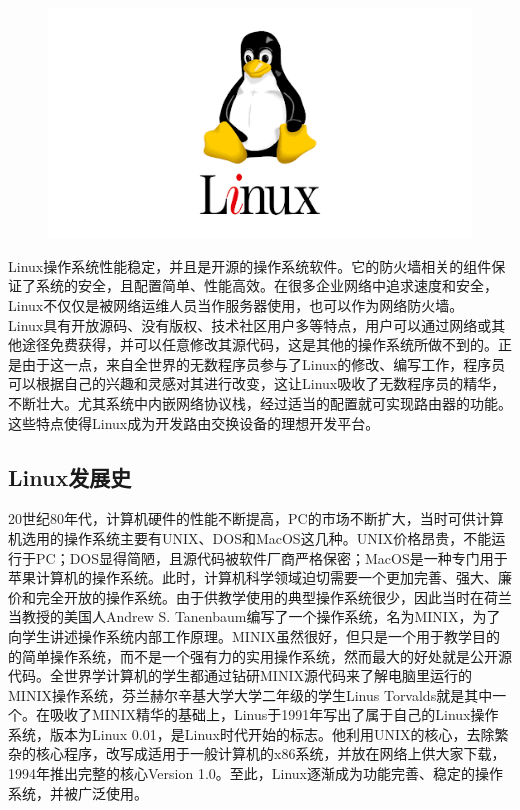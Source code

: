 \documentclass[12pt, openany, oneside]{book}
\begin{document}
\begin{figure}[H]
    \centering
    \includegraphics[scale=0.5]{img/C1/1-1/1.png}
\end{figure}

Linux操作系统性能稳定，并且是开源的操作系统软件。它的防火墙相关的组件保证了系统的安全，且配置简单、性能高效。在很多企业网络中追求速度和安全，Linux不仅仅是被网络运维人员当作服务器使用，也可以作为网络防火墙。 \\

Linux具有开放源码、没有版权、技术社区用户多等特点，用户可以通过网络或其他途径免费获得，并可以任意修改其源代码，这是其他的操作系统所做不到的。正是由于这一点，来自全世界的无数程序员参与了Linux的修改、编写工作，程序员可以根据自己的兴趣和灵感对其进行改变，这让Linux吸收了无数程序员的精华，不断壮大。尤其系统中内嵌网络协议栈，经过适当的配置就可实现路由器的功能。这些特点使得Linux成为开发路由交换设备的理想开发平台。 \\

\subsection{Linux发展史}

20世纪80年代，计算机硬件的性能不断提高，PC的市场不断扩大，当时可供计算机选用的操作系统主要有UNIX、DOS和MacOS这几种。UNIX价格昂贵，不能运行于PC；DOS显得简陋，且源代码被软件厂商严格保密；MacOS是一种专门用于苹果计算机的操作系统。此时，计算机科学领域迫切需要一个更加完善、强大、廉价和完全开放的操作系统。由于供教学使用的典型操作系统很少，因此当时在荷兰当教授的美国人Andrew S. Tanenbaum编写了一个操作系统，名为MINIX，为了向学生讲述操作系统内部工作原理。MINIX虽然很好，但只是一个用于教学目的的简单操作系统，而不是一个强有力的实用操作系统，然而最大的好处就是公开源代码。全世界学计算机的学生都通过钻研MINIX源代码来了解电脑里运行的MINIX操作系统，芬兰赫尔辛基大学大学二年级的学生Linus Torvalds就是其中一个。在吸收了MINIX精华的基础上，Linus于1991年写出了属于自己的Linux操作系统，版本为Linux 0.01，是Linux时代开始的标志。他利用UNIX的核心，去除繁杂的核心程序，改写成适用于一般计算机的x86系统，并放在网络上供大家下载，1994年推出完整的核心Version 1.0。至此，Linux逐渐成为功能完善、稳定的操作系统，并被广泛使用。 \\
\end{document}
